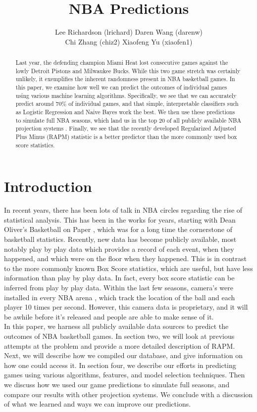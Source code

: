 \documentclass{article} %
\title{NBA Predictions}
\author{Lee Richardson (lrichard) Daren Wang (darenw) \\ Chi Zhang (chiz2) Xiaofeng Yu (xiaofen1)}
\begin{document}
\maketitle

\begin{abstract}
Last year, the defending champion Miami Heat lost consecutive games against the lowly Detroit Pistons and Milwaukee Bucks. While this two game stretch was certainly unlikely, it exemplifies the inherent randomness present in NBA basketball games. In this paper, we examine how well we can predict the outcomes of individual games using various machine learning algorithms. Specifically, we see that we can accurately predict around 70\% of individual games, and that simple, interpretable classifiers such as Logistic Regression and Naive Bayes work the best. We then use these predictions to simulate full NBA seasons, which land us in the top 20 of all publicly available NBA projection systems \cite{projections}. Finally, we see that the recently developed Regularized Adjusted Plus Minus (RAPM) statistic is a better predictor than the more commonly used box score statistics. 
\end{abstract}

\section{Introduction}
	In recent years, there has been lots of talk in NBA circles regarding the rise of statistical analysis\cite{revolution}. This has been in the works for years, starting with Dean Oliver's Basketball on Paper \cite{bop}, which was for a long time the cornerstone of basketball statistics. Recently, new data has become publicly available, most notably play by play data which provides a record of each event, when they happened, and which were on the floor when they happened. This is in contrast to the more commonly known Box Score statistics, which are useful, but have less information than play by play data. In fact, every box score statistic can be inferred from play by play data. Within the last few seasons, camera's were installed in every NBA arena \cite{sportsvu}, which track the location of the ball and each player 10 times per second. However, this camera data is proprietary, and it will be awhile before it's released and people are able to make sense of it. \\

	In this paper, we harness all publicly available data sources to predict the outcomes of NBA basketball games. In section two, we will look at previous attempts at the problem and provide a more detailed description of RAPM. Next, we will describe how we compiled our database, and give information on how one could access it. In section four, we describe our efforts in predicting games using various algorithms, features, and model selection techniques. Then we discuss how we used our game predictions to simulate full seasons, and compare our results with other projection systems. We conclude with a discussion of what we learned and ways we can improve our predictions. 
\end{document}
